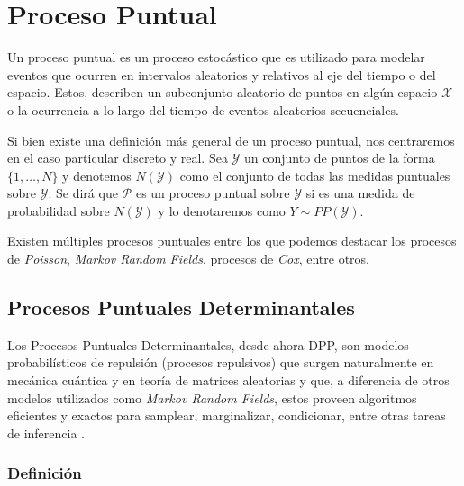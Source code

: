 \section{Proceso Puntual}

Un proceso puntual es un proceso estocástico que es utilizado para modelar eventos que ocurren en intervalos aleatorios y relativos al eje del tiempo o del espacio. Estos, describen un subconjunto aleatorio de puntos en algún espacio $\mathcal{X}$ o la ocurrencia a lo largo del tiempo de eventos aleatorios secuenciales. 

\vspace{0.2cm}

Si bien existe una definición más general de un proceso puntual, nos centraremos en el caso particular discreto y real. Sea $\mathcal{Y}$ un conjunto de puntos de la forma $\{ 1 , \dots , N \}$ y denotemos $N(\mathcal{Y})$ como el conjunto de todas las medidas puntuales sobre $\mathcal{Y}$. Se dirá que $\mathcal{P}$ es un proceso puntual sobre $\mathcal{Y}$ si es una medida de probabilidad sobre $N(\mathcal{Y})$ y lo denotaremos como $Y \sim PP(\mathcal{Y})$. 

\vspace{0.2cm}

Existen múltiples procesos puntuales entre los que podemos destacar los procesos de \textit{Poisson}, \textit{Markov Random Fields}, procesos de \textit{Cox}, entre otros. 


\subsection{Procesos Puntuales Determinantales}

Los Procesos Puntuales Determinantales, desde ahora DPP, son modelos probabilísticos de repulsión (procesos repulsivos) que surgen naturalmente en mecánica cuántica y en teoría de matrices aleatorias y que, a diferencia de otros modelos utilizados como \textit{Markov Random Fields}, estos proveen algoritmos eficientes y exactos para samplear, marginalizar, condicionar, entre otras tareas de inferencia \cite{Kulesza_2012}.


\subsubsection{Definición }

